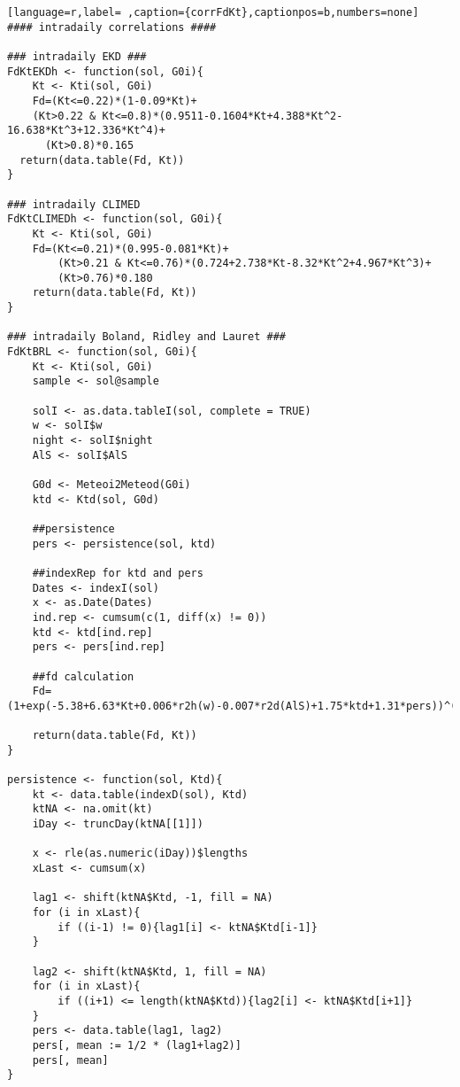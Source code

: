 \begin{lstlisting}[language=r,label= ,caption={corrFdKt},captionpos=b,numbers=none]
#### intradaily correlations ####

### intradaily EKD ###
FdKtEKDh <- function(sol, G0i){
    Kt <- Kti(sol, G0i)
    Fd=(Kt<=0.22)*(1-0.09*Kt)+
    (Kt>0.22 & Kt<=0.8)*(0.9511-0.1604*Kt+4.388*Kt^2-16.638*Kt^3+12.336*Kt^4)+
      (Kt>0.8)*0.165
  return(data.table(Fd, Kt))
}

### intradaily CLIMED
FdKtCLIMEDh <- function(sol, G0i){
    Kt <- Kti(sol, G0i)
    Fd=(Kt<=0.21)*(0.995-0.081*Kt)+
        (Kt>0.21 & Kt<=0.76)*(0.724+2.738*Kt-8.32*Kt^2+4.967*Kt^3)+
        (Kt>0.76)*0.180
    return(data.table(Fd, Kt))
}

### intradaily Boland, Ridley and Lauret ###
FdKtBRL <- function(sol, G0i){
    Kt <- Kti(sol, G0i)
    sample <- sol@sample

    solI <- as.data.tableI(sol, complete = TRUE)
    w <- solI$w
    night <- solI$night
    AlS <- solI$AlS

    G0d <- Meteoi2Meteod(G0i)
    ktd <- Ktd(sol, G0d)

    ##persistence    
    pers <- persistence(sol, ktd)

    ##indexRep for ktd and pers
    Dates <- indexI(sol)
    x <- as.Date(Dates)
    ind.rep <- cumsum(c(1, diff(x) != 0))
    ktd <- ktd[ind.rep]
    pers <- pers[ind.rep]

    ##fd calculation
    Fd=(1+exp(-5.38+6.63*Kt+0.006*r2h(w)-0.007*r2d(AlS)+1.75*ktd+1.31*pers))^(-1)

    return(data.table(Fd, Kt))
}

persistence <- function(sol, Ktd){
    kt <- data.table(indexD(sol), Ktd)
    ktNA <- na.omit(kt)
    iDay <- truncDay(ktNA[[1]])

    x <- rle(as.numeric(iDay))$lengths
    xLast <- cumsum(x)

    lag1 <- shift(ktNA$Ktd, -1, fill = NA)
    for (i in xLast){
        if ((i-1) != 0){lag1[i] <- ktNA$Ktd[i-1]}
    }

    lag2 <- shift(ktNA$Ktd, 1, fill = NA)
    for (i in xLast){
        if ((i+1) <= length(ktNA$Ktd)){lag2[i] <- ktNA$Ktd[i+1]}
    }
    pers <- data.table(lag1, lag2)
    pers[, mean := 1/2 * (lag1+lag2)]
    pers[, mean]
}
\end{lstlisting}
